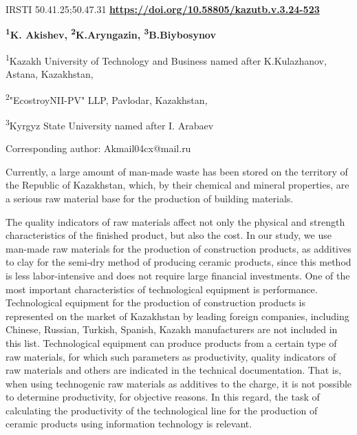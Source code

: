\newpage
IRSTI 50.41.25;50.47.31
\hfill {\bfseries \href{https://doi.org/10.58805/kazutb.v.3.24-523}{https://doi.org/10.58805/kazutb.v.3.24-523}}


\begin{center}
{\bfseries \textsuperscript{1}K. Akishev\envelope,
\textsuperscript{2}K.Aryngazin, \textsuperscript{3}B.Biybosynov}

\textsuperscript{1}Kazakh University of Technology and Business named
after K.Kulazhanov, Astana, Kazakhstan,

\textsuperscript{2}"EcostroyNII-PV" LLP, Pavlodar, Kazakhstan\emph{,}

\textsuperscript{3}Kyrgyz State University named after I. Arabaev
\end{center}
\envelope Corresponding author: Akmail04cx@mail.ru \vspace{0.5cm}

Currently, a large amount of man-made waste has been stored on the
territory of the Republic of Kazakhstan, which, by their chemical and
mineral properties, are a serious raw material base for the production
of building materials.

The quality indicators of raw materials affect not only the physical and
strength characteristics of the finished product, but also the cost. In
our study, we use man-made raw materials for the production of
construction products, as additives to clay for the semi-dry method of
producing ceramic products, since this method is less labor-intensive
and does not require large financial investments. One of the most
important characteristics of technological equipment is performance.
Technological equipment for the production of construction products is
represented on the market of Kazakhstan by leading foreign companies,
including Chinese, Russian, Turkish, Spanish, Kazakh manufacturers are
not included in this list. Technological equipment can produce products
from a certain type of raw materials, for which such parameters as
productivity, quality indicators of raw materials and others are
indicated in the technical documentation. That is, when using
technogenic raw materials as additives to the charge, it is not possible
to determine productivity, for objective reasons. In this regard, the
task of calculating the productivity of the technological line for the
production of ceramic products using information technology is relevant.

